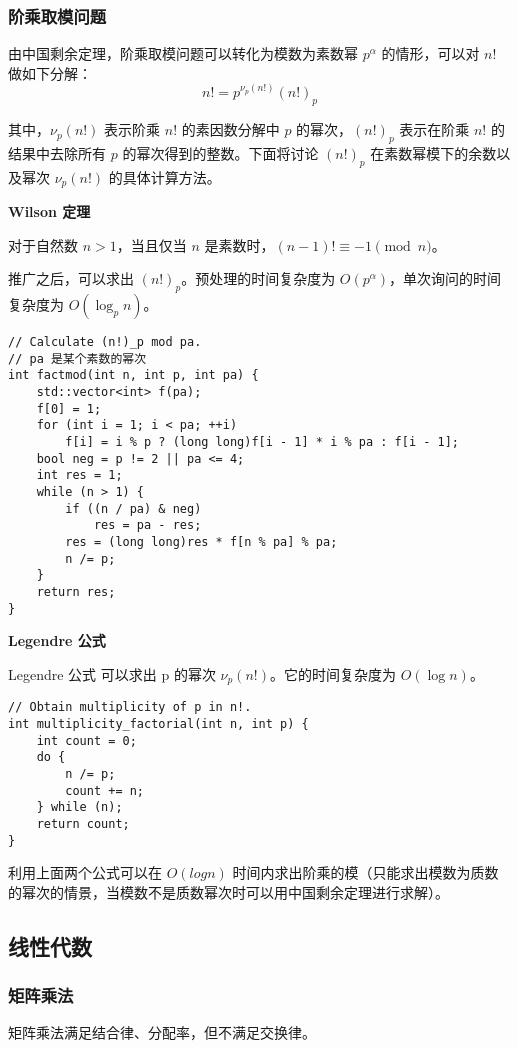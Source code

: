\documentclass[UTF8]{article}
\begin{document}
\subsubsection{阶乘取模问题}
由中国剩余定理，阶乘取模问题可以转化为模数为素数幂 $p^\alpha$ 的情形，可以对 $n!$ 做如下分解：
$$
n!=p^{\nu_p(n!)}(n!)_p
$$


其中，$\nu_p(n!)$ 表示阶乘 $n!$ 的素因数分解中 $p$ 的幂次，$(n!)_p$ 表示在阶乘 $n!$ 的结果中去除所有 $p$ 的幂次得到的整数。下面将讨论 $(n!)_p$ 在素数幂模下的余数以及幂次 $\nu_p(n!)$ 的具体计算方法。

\noindent \textbf{Wilson 定理}

对于自然数 $n>1$，当且仅当 $n$ 是素数时，$(n-1)!\equiv -1\pmod n$。

推广之后，可以求出 $(n!)_p$。预处理的时间复杂度为 $O(p^\alpha)$，单次询问的时间复杂度为 $O(\log_p n)$。
\begin{lstlisting}[caption=利用推广的 Wilson 定理求 $(n!)_p$]
// Calculate (n!)_p mod pa.
// pa 是某个素数的幂次
int factmod(int n, int p, int pa) {
    std::vector<int> f(pa);
    f[0] = 1;
    for (int i = 1; i < pa; ++i)
        f[i] = i % p ? (long long)f[i - 1] * i % pa : f[i - 1];
    bool neg = p != 2 || pa <= 4;
    int res = 1;
    while (n > 1) {
        if ((n / pa) & neg)
            res = pa - res;
        res = (long long)res * f[n % pa] % pa;
        n /= p;
    }
    return res;
}
\end{lstlisting}


\noindent \textbf{Legendre 公式}

Legendre 公式 可以求出 $\mathrm{p}$ 的幂次 $\nu_p(n!)$。它的时间复杂度为 $O(\log n)$。
\begin{lstlisting}[caption=利用 Legendre 公式求 $\nu_p(n!)$]
// Obtain multiplicity of p in n!.
int multiplicity_factorial(int n, int p) {
    int count = 0;
    do {
        n /= p;
        count += n;
    } while (n);
    return count;
}
\end{lstlisting}
利用上面两个公式可以在 $O(logn)$ 时间内求出阶乘的模（只能求出模数为质数的幂次的情景，当模数不是质数幂次时可以用中国剩余定理进行求解）。


\subsection{线性代数}


\subsubsection{矩阵乘法}
矩阵乘法满足结合律、分配率，但不满足交换律。
\end{document}
